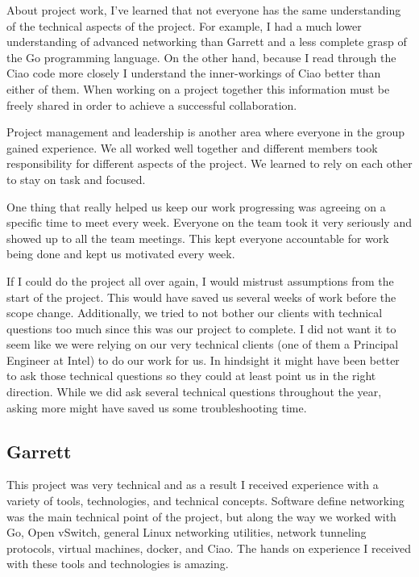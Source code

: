 \documentclass[10pt,onecolumn,journal,draftclsnofoot]{IEEEtran}
\begin{document}

About project work, I've learned that not everyone has the same understanding of the technical aspects of the project.
For example, I had a much lower understanding of advanced networking than Garrett and a less complete grasp of the Go
programming language. On the other hand, because I read through the Ciao code more closely I understand the inner-workings
of Ciao better than either of them. When working on a project together this information must be freely shared in order
to achieve a successful collaboration.


Project management and leadership is another area where everyone in the group gained
experience. We all worked well together and different members took responsibility for
different aspects of the project. We learned to rely on each other to stay on task and
focused.


One thing that really helped us keep our work progressing was agreeing on a specific time
to meet every week. Everyone on the team took it very seriously and showed up to all the
team meetings. This kept everyone accountable for work being done and kept us motivated
every week.


If I could do the project all over again, I would mistrust assumptions from the start of the project. This would have
saved us several weeks of work before the scope change. Additionally, we tried to not bother our clients with technical
questions too much since this was our project to complete. I did not want it to seem like we were relying on our very
technical clients (one of them a Principal Engineer at Intel) to do our work for us. In hindsight it might have been
better to ask those technical questions so they could at least point us in the right direction. While we did ask
several technical questions throughout the year, asking more might have saved us some troubleshooting time.

\subsection{Garrett}

This project was very technical and as a result I received experience with a variety of tools, technologies, and technical concepts.
Software define networking was the main technical point of the project, but along the way 
we worked with Go, Open vSwitch, general Linux networking utilities, network tunneling protocols, virtual machines, docker, and Ciao.
The hands on experience I received with these tools and technologies is amazing.
\end{document}
